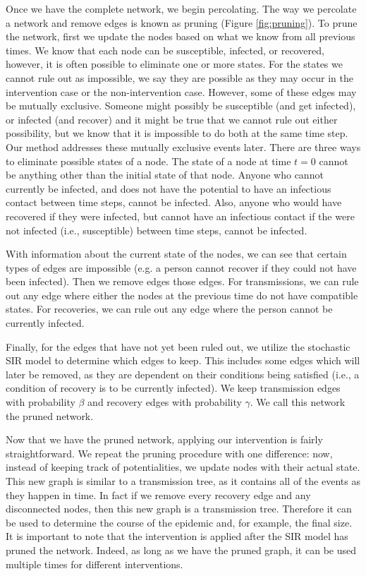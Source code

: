\documentclass[openacc]{rsproca_new}%
\begin{document}
Once we have the complete network, we begin percolating. 
The way we percolate a network and remove edges is known as pruning (Figure \ref{fig:pruning}).
To prune the network, first we update the nodes based on what we know from all previous times.
We know that each node can be susceptible, infected, or recovered, however, it is often possible to eliminate one or more states.
For the states we cannot rule out as impossible, we say they are possible as they may occur in the intervention case or the non-intervention case.
However, some of these edges may be mutually exclusive.
Someone might possibly be susceptible (and get infected), or infected (and recover) and it might be true that we cannot rule out either possibility, but we know that it is impossible to do both at the same time step.
Our method addresses these mutually exclusive events later.
There are three ways to eliminate possible states of a node.
The state of a node at time $t=0$ cannot be anything other than the initial state of that node.
Anyone who cannot currently be infected, and does not have the potential to have an infectious contact between time steps, cannot be infected.
Also, anyone who would have recovered if they were infected, but cannot have an infectious contact if the were not infected (i.e., susceptible) between time steps, cannot be infected.

With information about the current state of the nodes, we can see that certain types of edges are impossible (e.g. a person cannot recover if they could not have been infected).
Then we remove edges those edges.
For transmissions, we can rule out any edge where either the nodes at the previous time do not have compatible states.
For recoveries, we can rule out any edge where the person cannot be currently infected.

Finally, for the edges that have not yet been ruled out, we utilize the stochastic SIR model to determine which edges to keep.
This includes some edges which will later be removed, as they are dependent on their conditions being satisfied (i.e., a condition of recovery is to be currently infected).
We keep transmission edges with probability $\beta$ and recovery edges with probability $\gamma$.
We call this network the pruned network.

Now that we have the pruned network, applying our intervention is fairly straightforward.
We repeat the pruning procedure with one difference: now, instead of keeping track of potentialities, we update nodes with their actual state.
This new graph is similar to a transmission tree, as it contains all of the events as they happen in time.
In fact if we remove every recovery edge and any disconnected nodes, then this new graph is a transmission tree.
Therefore it can be used to determine the course of the epidemic and, for example, the final size.
It is important to note that the intervention is applied after the SIR model has pruned the network.
Indeed, as long as we have the pruned graph, it can be used multiple times for different interventions.
\end{document}
